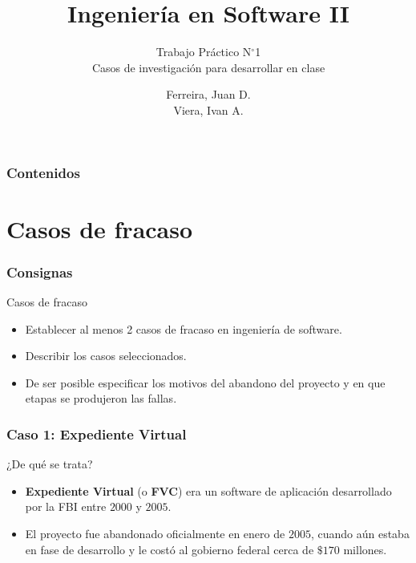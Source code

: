 \documentclass[11pt]{beamer}
\title{Ingeniería en Software II}
\subtitle[Ed/Ing]{Trabajo Práctico N$^{\circ}$1\\ 
	Casos de investigación para desarrollar en clase}
\author{Ferreira, Juan D.\\ %
	    Viera, Ivan A.      %
}
\begin{document}
	\begin{frame} %
		\titlepage
	\end{frame}

	\begin{frame}
		\frametitle{Contenidos}
		\tableofcontents[pausesections]
	\end{frame}

	\section[Casos de fracaso]{Casos de fracaso}
	\begin{frame}
		\frametitle{Consignas}
		\begin{exampleblock}{Casos de fracaso}
			\begin{itemize}
				\item Establecer al menos 2 casos de fracaso en ingeniería de software.
				\item Describir los casos seleccionados.
				\item De ser posible especificar los motivos del abandono del proyecto y en que etapas se produjeron
				las fallas.
			\end{itemize}
		\end{exampleblock}
	\end{frame}

	\begin{frame}
		\frametitle{Caso 1: Expediente Virtual}
		\begin{block}{¿De qué se trata?}
			\begin{itemize}
				\item \textbf{Expediente Virtual} (o \textbf{FVC}) era un software de aplicación desarrollado por la FBI entre $2000$ y $2005$.
				\item El proyecto fue abandonado oficialmente en enero de $2005$, cuando aún estaba en fase de desarrollo y le costó al gobierno federal cerca de $\$170$ millones.
			\end{itemize}
		\end{block}
	\end{frame}
\end{document}
